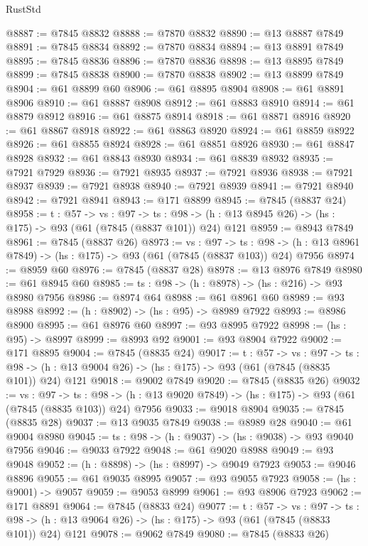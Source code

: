 \begin{lexlean}{RustStd}
\begin{coremodule}
@8887 := @7845 @8832
@8888 := @7870 @8832
@8890 := @13 @8887 @7849
@8891 := @7845 @8834
@8892 := @7870 @8834
@8894 := @13 @8891 @7849
@8895 := @7845 @8836
@8896 := @7870 @8836
@8898 := @13 @8895 @7849
@8899 := @7845 @8838
@8900 := @7870 @8838
@8902 := @13 @8899 @7849
@8904 := @61 @8899 @60
@8906 := @61 @8895 @8904
@8908 := @61 @8891 @8906
@8910 := @61 @8887 @8908
@8912 := @61 @8883 @8910
@8914 := @61 @8879 @8912
@8916 := @61 @8875 @8914
@8918 := @61 @8871 @8916
@8920 := @61 @8867 @8918
@8922 := @61 @8863 @8920
@8924 := @61 @8859 @8922
@8926 := @61 @8855 @8924
@8928 := @61 @8851 @8926
@8930 := @61 @8847 @8928
@8932 := @61 @8843 @8930
@8934 := @61 @8839 @8932
@8935 := @7921 @7929
@8936 := @7921 @8935
@8937 := @7921 @8936
@8938 := @7921 @8937
@8939 := @7921 @8938
@8940 := @7921 @8939
@8941 := @7921 @8940
@8942 := @7921 @8941
@8943 := @171 @8899
@8945 := @7845 (@8837 @24)
@8958 := {t : @57} ->
  {vs : @97} ->
  {ts : @98} -> (h : @13 @8945 @26) -> (hs : @175) -> @93 (@61 (@7845 (@8837 @101)) @24) @121
@8959 := @8943 @7849
@8961 := @7845 (@8837 @26)
@8973 := {vs : @97} ->
  {ts : @98} -> (h : @13 @8961 @7849) -> (hs : @175) -> @93 (@61 (@7845 (@8837 @103)) @24) @7956
@8974 := @8959 @60
@8976 := @7845 (@8837 @28)
@8978 := @13 @8976 @7849
@8980 := @61 @8945 @60
@8985 := {ts : @98} -> (h : @8978) -> (hs : @216) -> @93 @8980 @7956
@8986 := @8974 @64
@8988 := @61 @8961 @60
@8989 := @93 @8988
@8992 := (h : @8902) -> (hs : @95) -> @8989 @7922
@8993 := @8986 @8900
@8995 := @61 @8976 @60
@8997 := @93 @8995 @7922
@8998 := (hs : @95) -> @8997
@8999 := @8993 @92
@9001 := @93 @8904 @7922
@9002 := @171 @8895
@9004 := @7845 (@8835 @24)
@9017 := {t : @57} ->
  {vs : @97} ->
  {ts : @98} -> (h : @13 @9004 @26) -> (hs : @175) -> @93 (@61 (@7845 (@8835 @101)) @24) @121
@9018 := @9002 @7849
@9020 := @7845 (@8835 @26)
@9032 := {vs : @97} ->
  {ts : @98} -> (h : @13 @9020 @7849) -> (hs : @175) -> @93 (@61 (@7845 (@8835 @103)) @24) @7956
@9033 := @9018 @8904
@9035 := @7845 (@8835 @28)
@9037 := @13 @9035 @7849
@9038 := @8989 @28
@9040 := @61 @9004 @8980
@9045 := {ts : @98} -> (h : @9037) -> (hs : @9038) -> @93 @9040 @7956
@9046 := @9033 @7922
@9048 := @61 @9020 @8988
@9049 := @93 @9048
@9052 := (h : @8898) -> (hs : @8997) -> @9049 @7923
@9053 := @9046 @8896
@9055 := @61 @9035 @8995
@9057 := @93 @9055 @7923
@9058 := (hs : @9001) -> @9057
@9059 := @9053 @8999
@9061 := @93 @8906 @7923
@9062 := @171 @8891
@9064 := @7845 (@8833 @24)
@9077 := {t : @57} ->
  {vs : @97} ->
  {ts : @98} -> (h : @13 @9064 @26) -> (hs : @175) -> @93 (@61 (@7845 (@8833 @101)) @24) @121
@9078 := @9062 @7849
@9080 := @7845 (@8833 @26)

\end{coremodule}
\end{lexlean}

